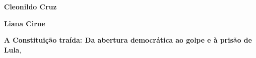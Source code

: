 \textbf{Cleonildo Cruz} \lipsum[1]

\textbf{Liana Cirne} \lipsum[2] 

\textbf{A Constituição traída: Da abertura democrática ao golpe e à prisão de Lula}, \lipsum[3]\par






